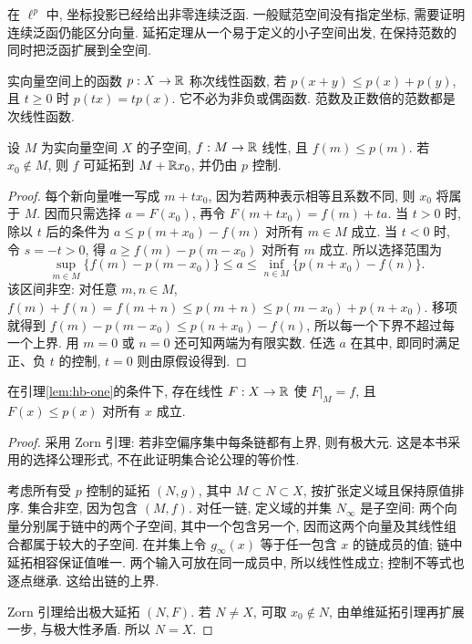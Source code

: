 \label{ch:dual}
在 $\ell^p$ 中, 坐标投影已经给出非零连续泛函. 一般赋范空间没有指定坐标, 需要证明连续泛函仍能区分向量. 延拓定理从一个易于定义的小子空间出发, 在保持范数的同时把泛函扩展到全空间.

\begin{definition}
实向量空间上的函数 $p:X\to\mathbb R$ 称次线性函数, 若 $p(x+y)\le p(x)+p(y)$, 且 $t\ge0$ 时 $p(tx)=tp(x)$. 它不必为非负或偶函数. 范数及正数倍的范数都是次线性函数.
\end{definition}

\begin{lemma}\label{lem:hb-one}
设 $M$ 为实向量空间 $X$ 的子空间, $f:M\to\mathbb R$ 线性, 且 $f(m)\le p(m)$. 若 $x_0\notin M$, 则 $f$ 可延拓到 $M+\mathbb R x_0$, 并仍由 $p$ 控制.
\end{lemma}
\begin{proof}
每个新向量唯一写成 $m+tx_0$, 因为若两种表示相等且系数不同, 则 $x_0$ 将属于 $M$. 因而只需选择 $a=F(x_0)$, 再令 $F(m+tx_0)=f(m)+ta$. 当 $t>0$ 时, 除以 $t$ 后的条件为 $a\le p(m+x_0)-f(m)$ 对所有 $m\in M$ 成立. 当 $t<0$ 时, 令 $s=-t>0$, 得 $a\ge f(m)-p(m-x_0)$ 对所有 $m$ 成立. 所以选择范围为
\[
\sup_{m\in M}\{f(m)-p(m-x_0)\}
\le a\le
\inf_{n\in M}\{p(n+x_0)-f(n)\}.
\]
该区间非空: 对任意 $m,n\in M$,
$f(m)+f(n)=f(m+n)\le p(m+n)\le p(m-x_0)+p(n+x_0)$.
移项就得到 $f(m)-p(m-x_0)\le p(n+x_0)-f(n)$, 所以每一个下界不超过每一个上界. 用 $m=0$ 或 $n=0$ 还可知两端为有限实数. 任选 $a$ 在其中, 即同时满足正、负 $t$ 的控制, $t=0$ 则由原假设得到.
\end{proof}

\begin{theorem}\label{thm:hb-real}
在引理\ref{lem:hb-one}的条件下, 存在线性 $F:X\to\mathbb R$ 使 $F|_M=f$, 且 $F(x)\le p(x)$ 对所有 $x$ 成立.
\end{theorem}
\begin{proof}
采用 Zorn 引理: 若非空偏序集中每条链都有上界, 则有极大元. 这是本书采用的选择公理形式, 不在此证明集合论公理的等价性.

考虑所有受 $p$ 控制的延拓 $(N,g)$, 其中 $M\subset N\subset X$, 按扩张定义域且保持原值排序. 集合非空, 因为包含 $(M,f)$. 对任一链, 定义域的并集 $N_\infty$ 是子空间: 两个向量分别属于链中的两个子空间, 其中一个包含另一个, 因而这两个向量及其线性组合都属于较大的子空间. 在并集上令 $g_\infty(x)$ 等于任一包含 $x$ 的链成员的值; 链中延拓相容保证值唯一. 两个输入可放在同一成员中, 所以线性性成立; 控制不等式也逐点继承. 这给出链的上界.

Zorn 引理给出极大延拓 $(N,F)$. 若 $N\ne X$, 可取 $x_0\notin N$, 由单维延拓引理再扩展一步, 与极大性矛盾. 所以 $N=X$.
\end{proof}

